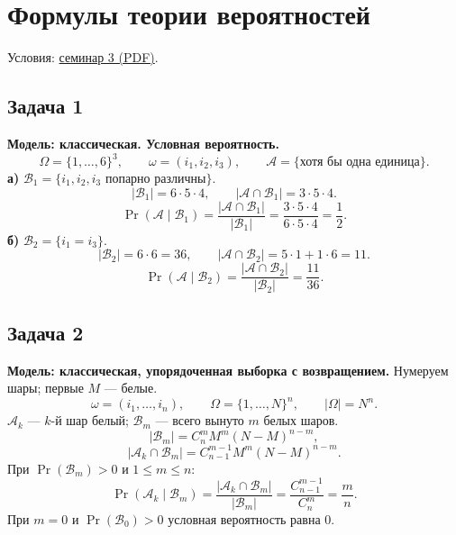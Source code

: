 \section{Формулы теории вероятностей}

\noindent Условия:
\href{run:conditions/sem_03.pdf}{семинар 3 (PDF)}.

\subsection{Задача 1}

\begin{solution}
    \textbf{Модель: классическая. Условная вероятность.}
    \[
        \Omega=\{1,\ldots,6\}^3,\qquad \omega=(i_1,i_2,i_3),\qquad
        \mathcal{A}=\{\text{хотя бы одна единица}\}.
    \]
    \textbf{а)} $\mathcal{B}_1=\{i_1,i_2,i_3\text{ попарно различны}\}$.
    \[
        |\mathcal{B}_1|=6\cdot5\cdot4,\qquad
        |\mathcal{A}\cap\mathcal{B}_1|=3\cdot5\cdot4.
    \]
    \[
        \Pr(\mathcal{A}\mid\mathcal{B}_1)
        =\frac{|\mathcal{A}\cap\mathcal{B}_1|}{|\mathcal{B}_1|}
        =\frac{3\cdot5\cdot4}{6\cdot5\cdot4}=\boxed{\frac12}.
    \]
    \textbf{б)} $\mathcal{B}_2=\{i_1=i_3\}$.
    \[
        |\mathcal{B}_2|=6\cdot6=36,\qquad
        |\mathcal{A}\cap\mathcal{B}_2|=5\cdot1+1\cdot6=11.
    \]
    \[
        \Pr(\mathcal{A}\mid\mathcal{B}_2)
        =\frac{|\mathcal{A}\cap\mathcal{B}_2|}{|\mathcal{B}_2|}
        =\boxed{\frac{11}{36}}.
    \]
\end{solution}

\subsection{Задача 2}

\begin{solution}
    \textbf{Модель: классическая, упорядоченная выборка с возвращением.}
    Нумеруем шары; первые $M$ --- белые.
    \[
        \omega=(i_1,\ldots,i_n),\qquad
        \Omega=\{1,\ldots,N\}^n,\qquad |\Omega|=N^n.
    \]
    $\mathcal{A}_k$ --- $k$-й шар белый;
    $\mathcal{B}_m$ --- всего вынуто $m$ белых шаров.
    \[
        |\mathcal{B}_m|=C_n^m M^m(N-M)^{n-m},
    \]
    \[
        |\mathcal{A}_k\cap\mathcal{B}_m|
        =C_{n-1}^{m-1}M^m(N-M)^{n-m}.
    \]
    При $\Pr(\mathcal{B}_m)>0$ и $1\leq m\leq n$:
    \[
        \Pr(\mathcal{A}_k\mid\mathcal{B}_m)
        =\frac{|\mathcal{A}_k\cap\mathcal{B}_m|}{|\mathcal{B}_m|}
        =\frac{C_{n-1}^{m-1}}{C_n^m}
        =\boxed{\frac mn}.
    \]
    При $m=0$ и $\Pr(\mathcal{B}_0)>0$ условная вероятность равна $0$.
\end{solution}


